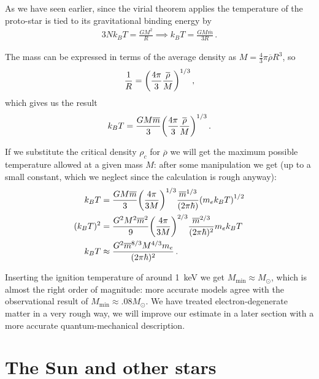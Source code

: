 \documentclass[main.tex]{subfiles}
\begin{document}
As we have seen earlier, since the virial theorem applies the temperature of the proto-star is tied to its gravitational binding energy by
%
\begin{align}
  3 N k_B T = \frac{GM^2}{R} \implies k_B T = \frac{GM \overline{m}}{3  R}
\,.
\end{align}

The mass can be expressed in terms of the average density as 
\(M = \frac{4}{3} \pi \overline{\rho} R^3 \), so 
%
\begin{align}
  \frac{1}{R} = \qty(\frac{4 \pi }{3} \frac{\overline{\rho}}{M})^{1/3}
\,,
\end{align}
%
which gives us the result 
%
\begin{align}
  k_B T = \frac{GM \overline{m}}{3} \qty(\frac{4 \pi }{3} \frac{\overline{\rho}}{M})^{1/3}
\,.
\end{align}

If we substitute the critical density \(\rho _c\) for \(\overline{\rho}\) we will get the maximum possible temperature allowed at a given mass \(M\): after some manipulation we get (up to a small constant, which we neglect since the calculation is rough anyway):
%
\begin{align}
  k_B T &= \frac{GM \overline{m}}{3} \qty(\frac{4 \pi }{3 M})^{1/3} \frac{\overline{m}^{1/3}}{(2 \pi \hbar)} \qty(m_e k_B T)^{1/2} \\
  (k_B T)^2 &= \frac{G^2M^2 \overline{m}^2}{9} 
  \qty(\frac{4 \pi }{3 M})^{2/3} \frac{\overline{m}^{2/3}}{(2 \pi \hbar)^2} m_e k_B T  \\
  k_B T &\approx \frac{G^2 \overline{m}^{8/3} M^{4/3} m_e}{(2 \pi \hbar)^2} 
\,.
\end{align}

Inserting the ignition temperature of around \SI{1}{keV} we get \(M _{\text{min}} \approx M_{\odot}\), which is almost the right order of magnitude: more accurate models agree with the observational result of \(M _{\text{min}} \approx \num{.08} M_{\odot}\). 
We have treated electron-degenerate matter in a very rough way, we will improve our estimate in a later section with a more accurate quantum-mechanical description.

\section{The Sun and other stars}
\end{document}
